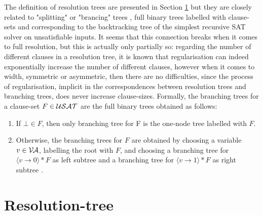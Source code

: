 \documentclass[]{book}
\begin{document}
The definition of resolution trees are presented in Section \ref{sec:Resolution-tree} but they are closely related to "splitting" or "brancing" trees , full binary trees labelled with clause-sets and corresponding 
to the backtracking tree of the simplest recursive SAT solver on unsatisfiable inputs. It seems that this connection breaks when it comes 
to full resolution, but this is actually only partially so: regarding the number of different clauses in a resolution tree, it is known 
that regularisation can indeed exponentially increase the number of different clauses, however when it comes to width, symmetric or 
asymmetric, then there are no difficulties, since the process of regularisation, implicit in the correspondences between resolution
trees and branching trees, does never increase clause-sizes.
Formally, the branching trees for a clause-set $F \in \mathcal{USAT}$ are the full binary trees obtained as follows:
\begin{enumerate}
\item If $\bot \in F$, then only branching tree for F is the one-node tree labelled with $F$.
\item Otherwise, the branching trees for $F$ are obtained by choosing a variable $v \in \mathcal{V\hspace{-0.1em}A}$, labelling the root with $F$, and choosing 
a branching tree for $\langle v \rightarrow 0 \rangle * F$ as left subtree and a branching tree for $\langle v \rightarrow 1 \rangle * F$ as right subtree \cite{h5}.
\end{enumerate}

\section{Resolution-tree}
\label{sec:Resolution-tree}
\end{document}
